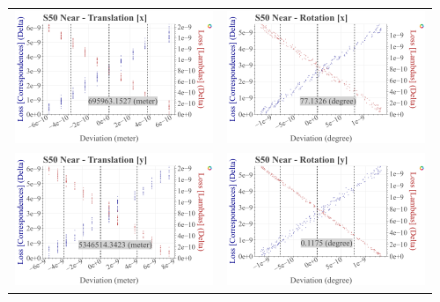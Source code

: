 \begin{figure}[!ht]
  \centering
  \begin{tabular}{cc}
    \includegraphics[width=0.45 \linewidth]{diagrams/calibration/s50_s_near/parameters.csv/Translation[x]_vs_Loss[Correspondences]_vs_Loss[Lambdas]_cluster_All.png} &
    \includegraphics[width=0.45 \linewidth]{diagrams/calibration/s50_s_near/parameters.csv/Rotation[x]_vs_Loss[Correspondences]_vs_Loss[Lambdas]_cluster_All.png} \\
    
    \includegraphics[width=0.45 \linewidth]{diagrams/calibration/s50_s_near/parameters.csv/Translation[y]_vs_Loss[Correspondences]_vs_Loss[Lambdas]_cluster_All.png} &
    \includegraphics[width=0.45 \linewidth]{diagrams/calibration/s50_s_near/parameters.csv/Rotation[y]_vs_Loss[Correspondences]_vs_Loss[Lambdas]_cluster_All.png} \\
    

\end{tabular}
\end{figure}

